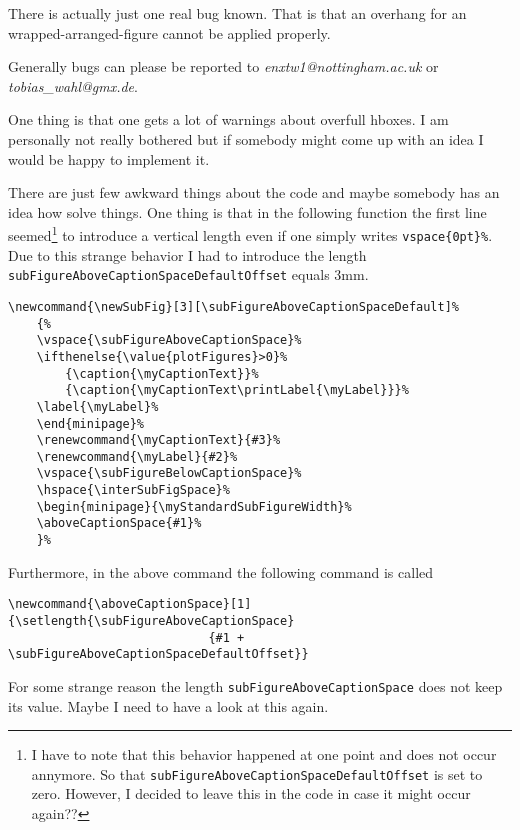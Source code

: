 \documentclass[12pt,a4paper]{article}
\newcommand{\comm}[1]{\texttt{#1}}
\begin{document}
There is actually just one real bug known. That is that an overhang for an
wrapped-arranged-figure cannot be applied properly.

Generally bugs can please be reported to \emph{enxtw1@nottingham.ac.uk} or 
\emph{tobias\_wahl@gmx.de}.

One thing is that one gets a lot of warnings about overfull hboxes. I am 
personally not really bothered but if somebody might come up with an idea
I would be happy to implement it.

There are just few awkward things about the code and maybe somebody has an idea
how solve things. One thing is that in the following 
function the first line seemed\footnote{I have to note that this behavior happened at one point and 
does not occur annymore. So that \comm{subFigureAboveCaptionSpaceDefaultOffset}
is set to zero. However, I decided to leave this in the code in case it might 
occur again??} to introduce a vertical length even if one
simply writes \comm{vspace\{0pt\}\%}. Due to this strange behavior I had to 
introduce the length \comm{subFigureAboveCaptionSpaceDefaultOffset} equals
3mm.


\begin{verbatim}
\newcommand{\newSubFig}[3][\subFigureAboveCaptionSpaceDefault]%
    {%
    \vspace{\subFigureAboveCaptionSpace}%
    \ifthenelse{\value{plotFigures}>0}%
        {\caption{\myCaptionText}}%
        {\caption{\myCaptionText\printLabel{\myLabel}}}%
    \label{\myLabel}%
    \end{minipage}%
    \renewcommand{\myCaptionText}{#3}%                                                   
    \renewcommand{\myLabel}{#2}%                                                                
    \vspace{\subFigureBelowCaptionSpace}%
    \hspace{\interSubFigSpace}%
    \begin{minipage}{\myStandardSubFigureWidth}%
    \aboveCaptionSpace{#1}%
    }%
\end{verbatim}

Furthermore, in the above command the following command is called

\begin{verbatim}
\newcommand{\aboveCaptionSpace}[1]{\setlength{\subFigureAboveCaptionSpace}
                            {#1 + \subFigureAboveCaptionSpaceDefaultOffset}}
\end{verbatim}

For some strange reason the length \comm{subFigureAboveCaptionSpace} does not
keep its value. Maybe I need to have a look at this again. 
\end{document}
